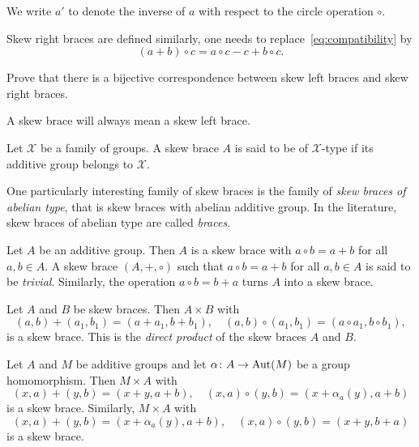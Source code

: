 We write $a'$ to denote the inverse of $a$ with respect to the circle operation $\circ$. 

Skew right braces are defined similarly, one needs 
to replace~\eqref{eq:compatibility} by 
\[
(a+b)\circ c=a\circ c-c+b\circ c.
\]

\begin{exercise}
Prove that there is a bijective correspondence between 
skew left braces and skew right braces. 
\end{exercise}

A skew brace will always mean a skew left brace. 

\begin{definition}
    Let $\mathcal{X}$ be a family of groups. A skew brace $A$ is said to be
    of $\mathcal{X}$-type if its additive group belongs to $\mathcal{X}$.
\end{definition}

One particularly interesting family of skew braces is the family of \emph{skew braces of abelian type}, 
that is skew braces with abelian additive group. 
In the literature, skew braces of abelian type are called \emph{braces}. 

\begin{example}
	\label{exa:trivial}
	Let $A$ be an additive group. Then $A$ is a skew brace with
	$a\circ b=a+b$ for all $a,b\in A$. 
	A skew brace $(A,+,\circ)$ such that $a\circ b=a+b$ for all $a,b\in A$ is
    said to be \emph{trivial}. 
	Similarly, the
   operation $a\circ b=b+a$ turns $A$ into a skew brace. 
\end{example}

\begin{example}
	\label{exa:times}
	Let $A$ and $B$ be skew braces. Then $A\times B$ with 
	\[
		(a,b)+(a_1,b_1)=(a+a_1,b+b_1),\quad
		(a,b)\circ (a_1,b_1)=(a\circ a_1,b\circ b_1),
	\]
	is a skew brace. This is the {\em direct product} of the skew braces $A$ and $B$. 
\end{example}

\begin{example}
	\label{exa:sd}
	Let $A$ and $M$ be additive groups and let $\alpha\colon A\to\operatorname{Aut}(M)$ be a
	group homomorphism. Then $M\times A$ with 
	\[
	(x,a)+(y,b)=(x+y,a+b),
	\quad
	(x,a)\circ (y,b)=(x+\alpha_a(y),a+b)
	\]
	is a skew brace. Similarly, $M\times A$ with
	\[
	(x,a)+(y,b)=(x+\alpha_a(y),a+b),\quad
	(x,a)\circ (y,b)=(x+y,b+a)
	\]
	is a skew brace. 
\end{example}

